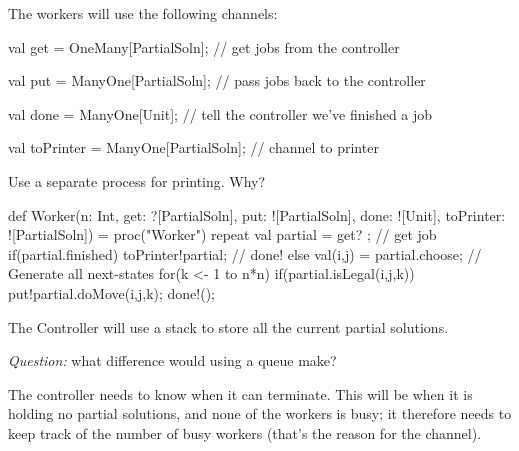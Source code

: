 
\begin{slide}

The workers will use the following channels:
\begin{scala}
val get = OneMany[PartialSoln]; 
// get jobs from the controller

val put = ManyOne[PartialSoln];
// pass jobs back to the controller

val done = ManyOne[Unit]; 
// tell the controller we've finished a job

val toPrinter = ManyOne[PartialSoln]; 
// channel to printer
\end{scala}
\end{slide}


\begin{selfnote}
Use a separate process for printing.  Why?
\end{selfnote}


\begin{slide}

\begin{scala}
def Worker(n: Int, get: ?[PartialSoln], put: ![PartialSoln], 
           done: ![Unit], toPrinter: ![PartialSoln]) 
= proc("Worker"){
  repeat{
    val partial = get? ; // get job
    if(partial.finished) toPrinter!partial;  // done!
    else{
      val(i,j) = partial.choose;
      // Generate all next-states
      for(k <- 1 to n*n)
        if(partial.isLegal(i,j,k)) 
          put!partial.doMove(i,j,k); 
    }
    done!();
  }
}
\end{scala}
\end{slide}


\begin{slide}

The Controller will use a stack to store all the current partial solutions.

\emph{Question:} what difference would using a queue make?

The controller needs to know when it can terminate.  This will be when it is
holding no partial solutions, and none of the workers is busy; it therefore
needs to keep track of the number of busy workers (that's the reason for the
 channel).
\end{slide}


